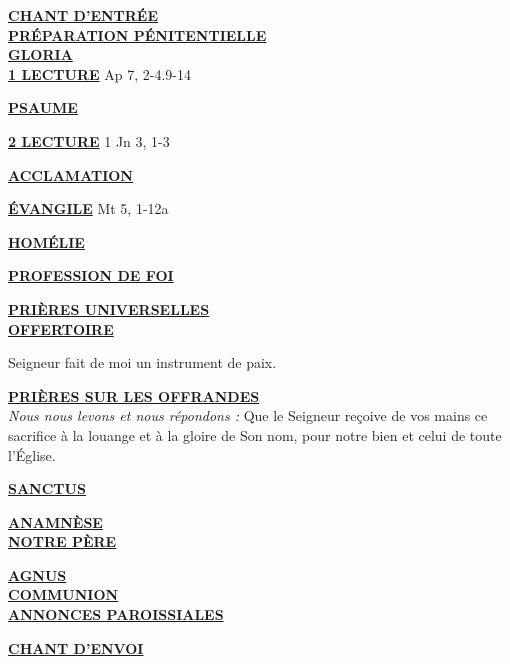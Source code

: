 \documentclass[french,11pt]{article}
\newcommand*{\chants}{../chants}
\newcommand*{\messe}{../messe_du_peuple_de_dieu}
\newcommand*{\pu}{../pu}
\newcommand*{\psaumes}{../psaumes}
\newcommand{\NewsItem}[1]{%
\vspace{3pt}
\underline{\textbf{#1}}
		  }
\begin{document}
\NewsItem{CHANT D'ENTRÉE}\\
	

\NewsItem{PRÉPARATION PÉNITENTIELLE}\\
	

\NewsItem{GLORIA}\\
	


\NewsItem{1\iere{} LECTURE} Ap 7, 2-4.9-14

\NewsItem{PSAUME}


\NewsItem{2\ieme{} LECTURE} 1 Jn 3, 1-3

\NewsItem{ACCLAMATION}


\NewsItem{ÉVANGILE} Mt 5, 1-12a

\NewsItem{HOMÉLIE}

\NewsItem{PROFESSION DE FOI}


\NewsItem{PRIÈRES UNIVERSELLES}\\

%
%
%

\NewsItem{OFFERTOIRE}
Seigneur fait de moi un instrument de paix.

\NewsItem{PRIÈRES SUR LES OFFRANDES}\\
\textit{Nous nous levons et nous répondons : }
Que le Seigneur reçoive de vos mains ce sacrifice à la louange et à la gloire
de Son nom, pour notre bien et celui de toute l’Église.


\NewsItem{SANCTUS}


\NewsItem{ANAMNÈSE}\\


\NewsItem{NOTRE PÈRE}

\NewsItem{AGNUS} \\


\NewsItem{COMMUNION}\\ 


\NewsItem{ANNONCES PAROISSIALES}


\NewsItem{CHANT D'ENVOI}\\


\newpage
\end{document}
